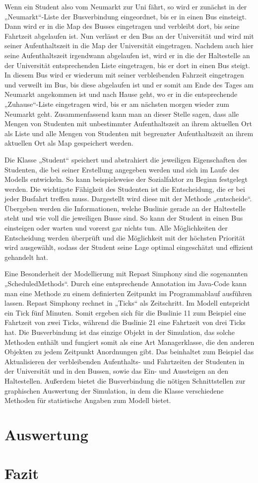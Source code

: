 \documentclass[12pt,a4paper]{scrartcl}
\begin{document}
Wenn ein Student also vom Neumarkt zur Uni fährt, so wird er zunächst in der „Neumarkt“-Liste der Busverbindung eingeordnet, bis er in einen Bus einsteigt. Dann wird er in die Map des Busses eingetragen und verbleibt dort, bis seine Fahrtzeit abgelaufen ist. Nun verlässt er den Bus an der Universität und wird mit seiner Aufenthaltszeit in die Map der Universität eingetragen. Nachdem auch hier seine Aufenthaltszeit irgendwann abgelaufen ist, wird er in die der Haltestelle an der Universität entsprechenden Liste eingetragen, bis er dort in einen Bus steigt. In diesem Bus wird er wiederum mit seiner verbleibenden Fahrzeit eingetragen und verweilt im Bus, bis diese abgelaufen ist und er somit am Ende des Tages am Neumarkt angekommen ist und nach Hause geht, wo er in die entsprechende „Zuhause“-Liste eingetragen wird, bis er am nächsten morgen wieder zum Neumarkt geht. Zusammenfassend kann man an dieser Stelle sagen, dass alle Mengen von Studenten mit unbestimmter Aufenthaltszeit an ihrem aktuellen Ort als Liste und alle Mengen von Studenten mit begrenzter Aufenthaltszeit an ihrem aktuellen Ort als Map gespeichert werden.

Die Klasse „Student“ speichert und abstrahiert die jeweiligen Eigenschaften des Studenten, die bei seiner Erstellung angegeben werden und sich im Laufe des Modells entwickeln. So kann beispielsweise der Sozialfaktor zu Beginn festgelegt werden. Die wichtigste Fähigkeit des Studenten ist die Entscheidung, die er bei jeder Busfahrt treffen muss. Dargestellt wird diese mit der Methode „entscheide“. Übergeben werden die Informationen, welche Buslinie gerade an der Haltestelle steht und wie voll die jeweiligen Busse sind. So kann der Student in einen Bus einsteigen oder warten und vorerst gar nichts tun. Alle Möglichkeiten der Entscheidung werden überprüft und die Möglichkeit mit der höchsten Priorität wird ausgewählt, sodass der Student seine Lage optimal eingeschätzt und effizient gehandelt hat.

Eine Besonderheit der Modellierung mit Repast Simphony sind die sogenannten „ScheduledMethods“. Durch eine entsprechende Annotation im Java-Code kann man eine Methode zu einem definierten Zeitpunkt im Programmablauf ausführen lassen. Repast Simphony rechnet in „Ticks“ als Zeitschritt. Im Modell entspricht ein Tick fünf Minuten. Somit ergeben sich für die Buslinie 11 zum Beispiel eine Fahrtzeit von zwei Ticks, während die Buslinie 21 eine Fahrtzeit von drei Ticks hat. Die Busverbindung ist das einzige Objekt in der Simulation, das solche Methoden enthält und fungiert somit als eine Art Managerklasse, die den anderen Objekten zu jedem Zeitpunkt Anordnungen gibt. Das beinhaltet zum Beispiel das Aktualisieren der verbleibenden Aufenthalts- und Fahrtzeiten der Studenten in der Universität und in den Bussen, sowie das Ein- und Aussteigen an den Haltestellen. Außerdem bietet die Busverbindung die nötigen Schnittstellen zur graphischen Auswertung der Simulation, in dem die Klasse verschiedene Methoden für statistische Angaben zum Modell bietet. 

\section{Auswertung}\label{erg}

\section{Fazit}\label{fazit}
\end{document}
